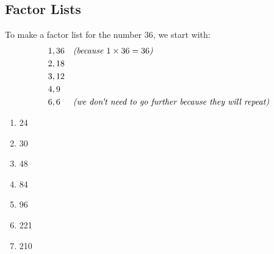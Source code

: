 \documentclass[a4paper,12pt]{article}
\begin{document}
\subsection{Factor Lists}
To make a factor list for the number 36, we start with:
\begin{align*}
&1,36&&\text{\textit{(because $1\times 36=36$)}}\\
&2,18&& \\
&3,12&&\\
&4,9&&\\
&6,6&&\text{\textit{(we don't need to go further because they will repeat)}}\\               
\end{align*}
\begin{tcolorbox}[colback=red!0!white, colframe=gray ,title=\subsubsection{Write factor lists for:}\label{factorlists}]
\begin{multicols}{4}
	\begin{enumerate}[label= \roman*)]
	 \item 24 
	 \item 30     
	 \item 48       
	 \item 84     
	 \item 96    
	 \item 221   
	 \item 210
	\end{enumerate}
\end{multicols}
\end{tcolorbox}\vspace{0.75cm}
\end{document}
